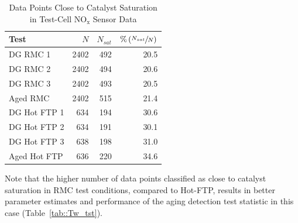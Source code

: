 \documentclass[subscriptcorrection,upint,varvw,barcolor=Goldenrod3,mathalfa=cal=euler,balance,hyphenate,french,pdf-a]{asmejour}
\newcommand{\lr}[1]{\left( #1 \right)}
\newcommand{\nox}{\text{NO}_{\text{x}}}
\begin{document}
\begin{table}[ht]
    \centering
    \caption{Data Points Close to Catalyst Saturation in Test-Cell $\nox$ Sensor Data}
    \label{tab::sat_data_perc_iod}
    \begin{tabular}{l r r r}
        \hline \hline
        Test         & $N$  & $N_{sat}$ & $\% \lr{ \sfrac{N_{sat}}{N} }$ \\\hline \hline
        DG RMC 1     & 2402 & 492       & 20.5                           \\
        DG RMC 2     & 2402 & 494       & 20.6                           \\
        DG RMC 3     & 2402 & 493       & 20.5                           \\
        Aged RMC     & 2402 & 515       & 21.4                           \\ \hline
        DG Hot FTP 1 & 634  & 194       & 30.6                           \\
        DG Hot FTP 2 & 634  & 191       & 30.1                           \\
        DG Hot FTP 3 & 638  & 198       & 31.0                           \\
        Aged Hot FTP & 636  & 220       & 34.6                           \\
        \hline\hline
    \end{tabular}
\end{table}
Note that the higher number of data points classified as close to catalyst saturation in RMC test conditions, compared
to Hot-FTP, results in better parameter estimates and performance of the aging detection test statistic in this case
(Table~\ref{tab::Tw_tst}).
\end{document}
